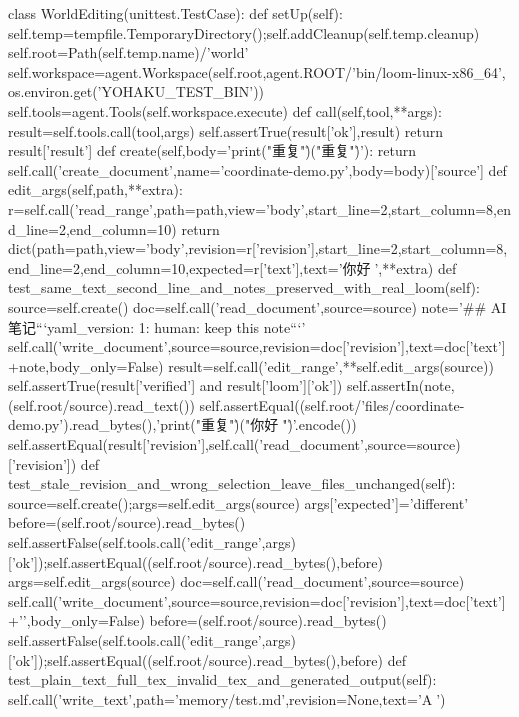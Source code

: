 class WorldEditing(unittest.TestCase):
    def setUp(self):
        self.temp=tempfile.TemporaryDirectory();self.addCleanup(self.temp.cleanup)
        self.root=Path(self.temp.name)/'world'
        self.workspace=agent.Workspace(self.root,agent.ROOT/'bin/loom-linux-x86_64',
                                       os.environ.get('YOHAKU_TEST_BIN'))
        self.tools=agent.Tools(self.workspace.execute)
    def call(self,tool,**args):
        result=self.tools.call(tool,args)
        self.assertTrue(result['ok'],result)
        return result['result']
    def create(self,body='print("重复")\r\nprint("重复")\r\n'):
        return self.call('create_document',name='coordinate-demo.py',body=body)['source']
    def edit_args(self,path,**extra):
        r=self.call('read_range',path=path,view='body',start_line=2,start_column=8,end_line=2,end_column=10)
        return dict(path=path,view='body',revision=r['revision'],start_line=2,start_column=8,end_line=2,end_column=10,expected=r['text'],text='你好🧸',**extra)
    def test_same_text_second_line_and_notes_preserved_with_real_loom(self):
        source=self.create()
        doc=self.call('read_document',source=source)
        note='\n## AI 笔记\n```yaml\nsource_version: 1\nwriter: human\nsummary: keep this note\n```\n'
        self.call('write_document',source=source,revision=doc['revision'],text=doc['text']+note,body_only=False)
        result=self.call('edit_range',**self.edit_args(source))
        self.assertTrue(result['verified'] and result['loom']['ok'])
        self.assertIn(note,(self.root/source).read_text())
        self.assertEqual((self.root/'files/coordinate-demo.py').read_bytes(),'print("重复")\r\nprint("你好🧸")\r\n'.encode())
        self.assertEqual(result['revision'],self.call('read_document',source=source)['revision'])
    def test_stale_revision_and_wrong_selection_leave_files_unchanged(self):
        source=self.create();args=self.edit_args(source)
        args['expected']='different'
        before=(self.root/source).read_bytes()
        self.assertFalse(self.tools.call('edit_range',args)['ok']);self.assertEqual((self.root/source).read_bytes(),before)
        args=self.edit_args(source)
        doc=self.call('read_document',source=source)
        self.call('write_document',source=source,revision=doc['revision'],text=doc['text']+'\n',body_only=False)
        before=(self.root/source).read_bytes()
        self.assertFalse(self.tools.call('edit_range',args)['ok']);self.assertEqual((self.root/source).read_bytes(),before)
    def test_plain_text_full_tex_invalid_tex_and_generated_output(self):
        self.call('write_text',path='memory/test.md',revision=None,text='A🧸\nB')
